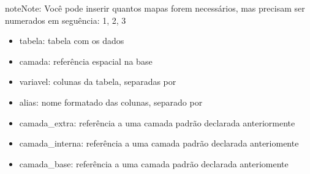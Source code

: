 \documentclass[letterpaper,10pt,brazil]{sphinxmanual}
\begin{document}
\begin{sphinxadmonition}{note}{Note:}
\sphinxAtStartPar
Você pode inserir quantos mapas forem necessários, mas precisam ser numerados
em seguência: 1, 2, 3
\end{sphinxadmonition}
\begin{description}
\begin{itemize}
\item {} 
\sphinxAtStartPar
tabela: tabela com os dados

\item {} 
\sphinxAtStartPar
camada: referência espacial na base

\item {} 
\sphinxAtStartPar
variavel: colunas da tabela, separadas por \sphinxcode{\sphinxupquote{\#}}

\item {} 
\sphinxAtStartPar
alias: nome formatado das colunas, separado por \sphinxcode{\sphinxupquote{\#}}

\item {} 
\sphinxAtStartPar
camada\_extra: referência a uma camada padrão declarada anteriormente

\item {} 
\sphinxAtStartPar
camada\_interna: referência a uma camada padrão declarada anteriomente

\item {} 
\sphinxAtStartPar
camada\_base: referência a uma camada padrão declarada anteriomente

\end{itemize}

\end{description}
\end{document}
